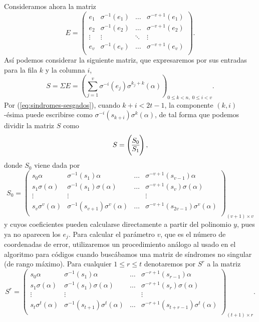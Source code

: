 Consideramos ahora la matriz 
\[
  E = \begin{pmatrix}
    e_1 & \sigma^{-1}(e_1) & \dots & \sigma^{-v + 1}(e_1)\\
    e_2 & \sigma^{-1}(e_2) & \dots & \sigma^{-v + 1}(e_2)\\
    \vdots & \vdots & \ddots & \vdots \\
    e_v & \sigma^{-1}(e_v) & \dots & \sigma^{-v + 1}(e_v)\\
  \end{pmatrix}.
\]
Así podemos considerar la siguiente matriz, que expresaremos por sus entradas para la fila \(k\) y la columna \(i\),
\[
  S = \Sigma E = \left(\sum_{j=1}^v \sigma^{-i}(e_j)\sigma^{k_j+k}(\alpha)\right)_{0 \leq k < n,\; 0 \leq i < v}.
\]
Por (\ref{eq:sindromes-sesgados}), cuando \(k + i < 2t - 1\), la componente \((k, i)\)-ésima puede escribirse como \(\sigma^{-i}(s_{k+i})\sigma^{k}(\alpha)\), de tal forma que podemos dividir la matriz \(S\) como
\[
  S = \left( \begin{array}{@{}c@{}}
    S_0\\\hline
    S_1
  \end{array}\right),
\]
donde \(S_0\) viene dada por
\[
  S_0 = \begin{pmatrix}
    s_0\alpha & \sigma^{-1}(s_1)\alpha & \dots & \sigma^{-v+1}(s_{v-1})\alpha\\
    s_1\sigma(\alpha) & \sigma^{-1}(s_1)\sigma(\alpha) & \dots & \sigma^{-v+1}(s_{v})\sigma(\alpha)\\
    \vdots & \vdots & & \vdots \\
    s_v\sigma^v(\alpha) & \sigma^{-1}(s_{v+1})\sigma^v(\alpha) & \dots & \sigma^{-v+1}(s_{2v-1})\sigma^v(\alpha)\\
  \end{pmatrix}_{(v + 1) \times v}
\]
y cuyos coeficientes pueden calcularse directamente a partir del polinomio \(y\), pues ya no aparecen los \(e_j\).
Para calcular el parámetro \(v\), que es el número de coordenadas de error, utilizaremos un procedimiento análogo al usado en el algoritmo  para códigos  cuando buscábamos una matriz de síndromes no singular (de rango máximo).
Para cualquier \(1 \leq r \leq t\) denotaremos por \(S^r\) a la matriz
\[
  S^r = \begin{pmatrix}
    s_0\alpha & \sigma^{-1}(s_1)\alpha & \dots & \sigma^{-r+1}(s_{r-1})\alpha\\
    s_1\sigma(\alpha) & \sigma^{-1}(s_1)\sigma(\alpha) & \dots & \sigma^{-r+1}(s_{r})\sigma(\alpha)\\
    \vdots & \vdots & & \vdots \\
    s_t\sigma^t(\alpha) & \sigma^{-1}(s_{t+1})\sigma^t(\alpha) & \dots & \sigma^{-r+1}(s_{t+r-1})\sigma^t(\alpha)\\
  \end{pmatrix}_{(t + 1) \times r}.
\]
